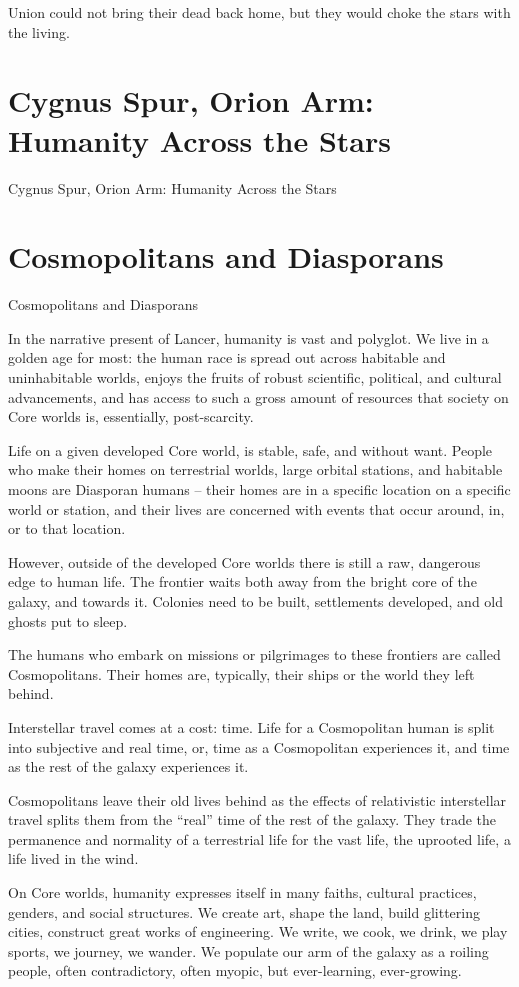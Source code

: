 Union could not bring their dead back home, but they would choke the stars with the living.

\section{Cygnus Spur, Orion Arm: Humanity Across the Stars}

Cygnus Spur, Orion Arm: Humanity
Across the Stars
\section{Cosmopolitans and Diasporans}
Cosmopolitans and Diasporans

In the narrative present of Lancer, humanity is vast and polyglot. We live in a golden age
for most: the human race is spread out across habitable and uninhabitable worlds, enjoys the
fruits of robust scientific, political, and cultural advancements, and has access to such a gross
amount of resources that society on Core worlds is, essentially, post-scarcity.


Life on a given developed Core world, is stable, safe, and without want. People who make their
homes on terrestrial worlds, large orbital stations, and habitable moons are Diasporan humans --
their homes are in a specific location on a specific world or station, and their lives are concerned
with events that occur around, in, or to that location.


However, outside of the developed Core worlds there is still a raw, dangerous edge to human life.
The frontier waits both away from the bright core of the galaxy, and towards it. Colonies need to
be built, settlements developed, and old ghosts put to sleep.


The humans who embark on missions or pilgrimages to these frontiers are called Cosmopolitans.
Their homes are, typically, their ships or the world they left behind.


Interstellar travel comes at a cost: time. Life for a Cosmopolitan human is split into subjective
and real time, or, time as a Cosmopolitan experiences it, and time as the rest of the galaxy
experiences it.


Cosmopolitans leave their old lives behind as the effects of relativistic interstellar travel splits
them from the “real” time of the rest of the galaxy. They trade the permanence and normality of a
terrestrial life for the vast life, the uprooted life, a life lived in the wind.


On Core worlds, humanity expresses itself in many faiths, cultural practices, genders, and social
structures. We create art, shape the land, build glittering cities, construct great works of
engineering. We write, we cook, we drink, we play sports, we journey, we wander. We populate
our arm of the galaxy as a roiling people, often contradictory, often myopic, but ever-learning,
ever-growing.


